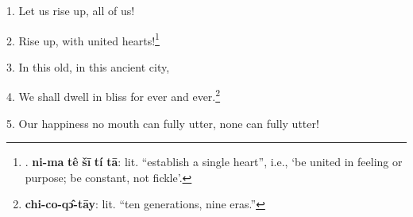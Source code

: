 \setcounter{footnote}{0}

1. Let us rise up, all of us!

2. Rise up, with united hearts!\footnote{. \textbf{ni-ma} \textbf{tê} \textbf{šī} \textbf{tí} \textbf{tā}: lit. ``establish a single heart'', i.e., `be united in feeling or purpose; be constant, not fickle'.}

3. In this old, in this ancient city,

4. We shall dwell in bliss for ever and ever.\footnote{\textbf{chi-co-qɔ̂-tāy}: lit. ``ten generations, nine eras.''}

5. Our happiness no mouth can fully utter, none can fully utter!

